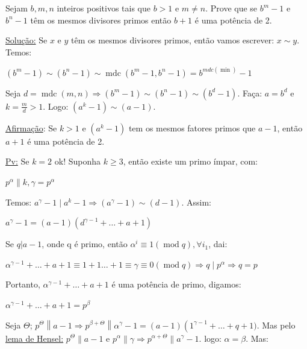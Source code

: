 \documentclass[a4paper,12pt]{article}
\renewcommand{\geq}{\ensuremath{\geqslant}}
\theoremstyle{plain} %
\theoremstyle{definition} %
\theoremstyle{remark} %
\begin{document}
	Sejam $b, m, n$ inteiros positivos tais que $b>1$ e $m\neq n$. Prove que se $b^m-1$ e $b^n-1$ t\^em os mesmos divisores primos ent\~ao $b+1$ \'e uma pot\^encia de 2.
	
	\begin{framed}
		\underline{Solu\c{c}\~ao:} Se $x$ e $y$ t\^em os mesmos divisores primos, ent\~ao vamos escrever: $x\sim y$. Temos:
		
		$\left(b^{m}-1\right) \sim\left(b^{n}-1\right) \sim \operatorname{mdc}\left(b^{m}-1, b^{n}-1\right)= b^{mdc(\min)}-1$
		
		Seja $d=\operatorname{mdc}\left(m, n\right) \Rightarrow\left(b^{m}-1\right) \sim\left(b^{n}-1\right) \sim\left(b^{d}-1\right)$. Fa\c{c}a: $a=b^d$ e $k=\frac{m}{d}>1$. Logo: $\left(a^{k}-1\right) \sim(a-1)$.
		
		\underline{Afirma\c{c}\~ao}: Se $k>1$ e $(a^{k}-1)$ tem os mesmos fatores primos que $a-1$, ent\~ao $a+1$ \'e uma pot\^encia de 2.
		
		\underline{Pv:} Se $k=2$ ok! Suponha $k\geq 3$, ent\~ao existe um primo \'impar, com:
		
		\begin{center}
			$p^{\alpha} \| k, \gamma=p^{\alpha}$
		\end{center}
		
		Temos: $a^{\gamma}-1 \mid a^{k}-1 \Rightarrow\left(a^{\gamma}-1\right) \sim(d-1)$. Assim:
		
		\begin{center}
			$a^{\gamma}-1=(a-1)\left(d^{\gamma-1}+\ldots+a+1\right)$
		\end{center}
		
		Se $q|a-1$, onde q \'e primo, ent\~ao $\alpha^{i} \equiv 1(\operatorname{mod} q), \forall i_{1}$, dai:
		
		\begin{center}
			$\alpha^{\gamma-1}+\ldots+a+1 \equiv 1+1 \ldots+1 \equiv \gamma \equiv 0(\operatorname{mod} q) \Rightarrow q \mid p^{\alpha} \Rightarrow q=p$
		\end{center}
		
		Portanto, $\alpha^{\gamma-1}+\ldots+a+1$ \'e uma pot\^encia de primo, digamos:
		
		\begin{center}
			$\alpha^{\gamma-1}+\ldots+a+1=p^{\beta}$
		\end{center}
		
		Seja $\Theta$; $p^{\Theta}\left\|a-1 \Rightarrow p^{\beta+\Theta}\right\| \alpha^{\gamma}-1=(a-1)\left(1^{\gamma-1}+\ldots+\right. q+1)$. Mas pelo \underline{lema de Hensel:} $p^{\Theta}\|a-1$ e $p^{\alpha}\|\gamma\Rightarrow p^{\alpha+\Theta}\|a^{\gamma}-1$. logo: $\alpha=\beta$. Mas:
		

\end{framed}
\end{document}
